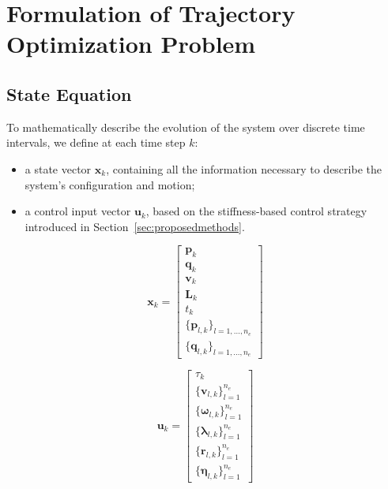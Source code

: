 \documentclass[main.tex]{subfiles}
\begin{document}
\section{Formulation of Trajectory Optimization Problem}
\label{sec:formulation}
\subsection{State Equation}
To mathematically describe the evolution of the system over discrete time intervals, we define at each time step $k$:
\begin{itemize}
    \item a state vector $\mathbf{x}_k$, containing all the information necessary to describe the system's configuration and motion;
    \item a control input vector $\mathbf{u}_k$, based on the stiffness-based control strategy introduced in Section~\ref{sec:proposedmethods}.
\end{itemize}

\vspace{0.3cm} %

\noindent
\begin{minipage}{0.48\textwidth}
\begin{equation}
    \mathbf{x}_k = 
    \left[
    \begin{array}{c}
    \mathbf{p}_k \\
    \mathbf{q}_k \\
    \mathbf{v}_k \\
    \mathbf{L}_k \\
    t_k \\
    \{\mathbf{p}_{l,k}\}_{l=1,\dots,n_e} \\
    \{\mathbf{q}_{l,k}\}_{l=1,\dots,n_e}
    \end{array}
    \right]
\end{equation}
\end{minipage}
\hfill
\begin{minipage}{0.48\textwidth}
\begin{equation}
    \mathbf{u}_k = 
    \left[ 
   \begin{array}{c}
   \tau_k \\
   \{ \mathbf{v}_{l,k} \}_{l=1}^{n_e} \\
   \{ \boldsymbol{\omega}_{l,k} \}_{l=1}^{n_e} \\
   \{ \boldsymbol{\lambda}_{l,k} \}_{l=1}^{n_e} \\
   \{ \mathbf{r}_{l,k} \}_{l=1}^{n_e} \\
   \{ \boldsymbol{\eta}_{l,k} \}_{l=1}^{n_e} 
   \end{array}
   \right]
\end{equation}
\end{minipage}
\end{document}
